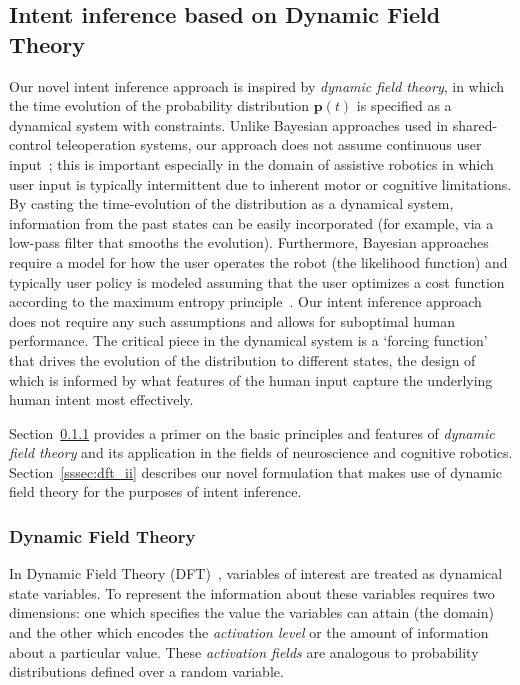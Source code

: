 \documentclass[natbib, twocolumn]{svjour3}          %
\begin{document}
\subsection{Intent inference based on Dynamic Field Theory}\label{ssec:ii_dft}
Our novel intent inference approach is inspired by \textit{dynamic field theory}, in which the time evolution of the probability distribution $\boldsymbol{p}(t)$ is specified as a dynamical system with constraints. Unlike Bayesian approaches used in shared-control teleoperation systems, our approach does not assume continuous user input~\citep{dragan2013policy,pellegrinelli2016human}; this is important especially in the domain of assistive robotics in which user input is typically intermittent due to inherent motor or cognitive limitations. By casting the time-evolution of the distribution as a dynamical system, information from the past states can be easily incorporated (for example, via a low-pass filter that smooths the evolution). Furthermore, Bayesian approaches require a model for how the user operates the robot (the likelihood function) and typically user policy is modeled assuming that the user optimizes a cost function according to the maximum entropy principle~\citep{javdani2017shared, ziebart2008maximum}. Our intent inference approach does not require any such assumptions and allows for suboptimal human performance. The critical piece in the dynamical system is a `forcing function' that drives the evolution of the distribution to different states, the design of which is informed by what features of the human input capture the underlying human intent most effectively. 

 Section~\ref{sssec:dft} provides a primer on the basic principles and features of \textit{dynamic field theory} and its application in the fields of neuroscience and cognitive robotics. Section~\ref{sssec:dft_ii} describes our novel formulation that makes use of dynamic field theory for the purposes of intent inference. 

\subsubsection{Dynamic Field Theory}\label{sssec:dft}

In Dynamic Field Theory (DFT)~\citep{schoner2015dynamic}, variables of interest are treated as dynamical state variables. To represent the information about these variables requires two dimensions: one which specifies the value the variables can attain (the domain) and the other which encodes the \textit{activation level} or the amount of information about a particular value. These \textit{activation fields} are analogous to probability distributions defined over a random variable. 
\end{document}
